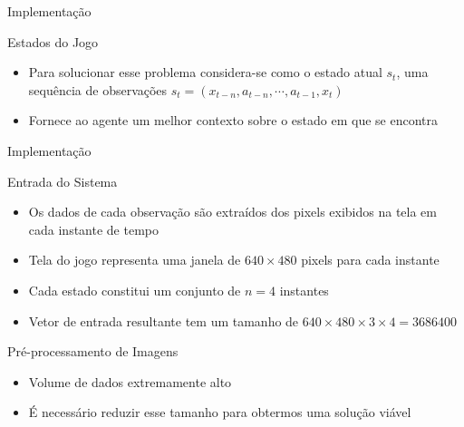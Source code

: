 \documentclass[aspectratio=169]{beamer}
\begin{document}
\begin{frame}{Implementação}
	\begin{block}{Estados do Jogo}
		\begin{itemize}
			\item Para solucionar esse problema considera-se como o estado atual $s_t$, uma sequência de observações $s_t = (x_{t-n},a_{t-n},\cdots,a_{t-1},x_t)$
			\item Fornece ao agente um melhor contexto sobre o estado em que se encontra
		\end{itemize}
	\end{block}

	\begin{figure}
	\end{figure}
	
\end{frame}

\begin{frame}{Implementação}
	\begin{block}{Entrada do Sistema}
		\begin{itemize}
			\item Os dados de cada observação são extraídos dos pixels exibidos na tela em cada instante de tempo
			\item Tela do jogo representa uma janela de $640\times480$ pixels
			para cada instante
			\item Cada estado constitui um conjunto de $n=4$ instantes
			\item Vetor de entrada resultante tem um tamanho de $640\times480\times3\times4=3686400$
		\end{itemize}
	\end{block}
	\pause
	\begin{block}{Pré-processamento de Imagens}
		\begin{itemize}
			\item Volume de dados extremamente alto
			\item É necessário reduzir esse tamanho para obtermos uma solução viável
		\end{itemize}
	\end{block}
	
\end{frame}
\end{document}
